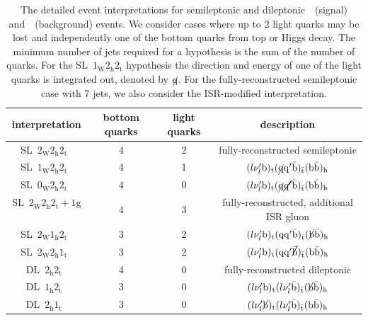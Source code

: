 \begin{table}[h!]
\begin{center}
\begin{tabular}{c|ccc}
\hline
interpretation & bottom quarks & light quarks & description \\
\hline
SL~$2_{\mathrm{W}} 2_{\mathrm{h}} 2_{\mathrm{t}}$~& 4 & 2 & fully-reconstructed semileptonic \\
SL~$1_{\mathrm{W}} 2_{\mathrm{h}} 2_{\mathrm{t}}$~& 4 & 1 &~$(l \nu_{l}' \mathrm{b})_{\mathrm{t}} (\cancel{\mathrm{q}} \mathrm{q}' \bar{\mathrm{b}})_{\bar{\mathrm{t}}} (\mathrm{b} \bar{\mathrm{b}})_{\mathrm{h}}$~\\
SL~$0_{\mathrm{W}} 2_{\mathrm{h}} 2_{\mathrm{t}}$~& 4 & 0 &~$(l \nu_{l}' \mathrm{b})_{\mathrm{t}} (\cancel{\mathrm{q}} \cancel{\mathrm{q}'} \bar{\mathrm{b}})_{\bar{\mathrm{t}}} (\mathrm{b} \bar{\mathrm{b}})_{\mathrm{h}}$~\\
SL~$2_{\mathrm{W}} 2_{\mathrm{h}} 2_{\mathrm{t}}+1\mathrm{g}$~& 4 & 3 & fully-reconstructed, additional ISR gluon \\
SL~$2_{\mathrm{W}} 1_{\mathrm{h}} 2_{\mathrm{t}}$~& 3 & 2 &~$(l \nu_{l}' \mathrm{b})_{\mathrm{t}} (\mathrm{q} \mathrm{q}' \bar{\mathrm{b}})_{\bar{\mathrm{t}}} (\cancel{\mathrm{b}} \bar{\mathrm{b}})_{\mathrm{h}}$~\\
SL~$2_{\mathrm{W}} 2_{\mathrm{h}} 1_{\mathrm{t}}$~& 3 & 2 &~$(l \nu_{l}' \mathrm{b})_{\mathrm{t}} (\mathrm{q} \mathrm{q}' \cancel{\bar{\mathrm{b}}})_{\bar{\mathrm{t}}} (\mathrm{b} \bar{\mathrm{b}})_{\mathrm{h}}$~\\
\hline
DL~$2_{\mathrm{h}} 2_{\mathrm{t}}$~& 4 & 0 & fully-reconstructed dileptonic \\
DL~$1_{\mathrm{h}} 2_{\mathrm{t}}$~& 3 & 0 &~$(l \nu_{l}' \mathrm{b})_{\mathrm{t}} (l \nu_{l}' \bar{\mathrm{b}})_{\bar{\mathrm{t}}} (\cancel{\mathrm{b}} \bar{\mathrm{b}})_{\mathrm{h}}$~\\
DL~$2_{\mathrm{h}} 1_{\mathrm{t}}$~& 3 & 0 &~$(l \nu_{l}' \cancel{\mathrm{b}})_{\mathrm{t}} (l \nu_{l}' \bar{\mathrm{b}})_{\bar{\mathrm{t}}} (\mathrm{b} \bar{\mathrm{b}})_{\mathrm{h}}$~\\
\hline
\hline
\end{tabular}
\caption{The detailed event interpretations for semileptonic and dileptonic~\ttH~(signal) and~\ttbb~(background) events. We consider cases where up to 2 light quarks may be lost and independently one of the bottom quarks from top or Higgs decay. The minimum number of jets required for a hypothesis is the sum of the number of quarks. For the SL~$1_{\mathrm{W}} 2_{\mathrm{h}} 2_{\mathrm{t}}$ hypothesis the direction and energy of one of the light quarks is integrated out, denoted by $\cancel{\mathrm{q}}$. For the fully-reconstructed semileptonic case with 7 jets, we also consider the ISR-modified interpretation.}
\label{tab:event_interpretation_list}
\end{center}
\end{table}


